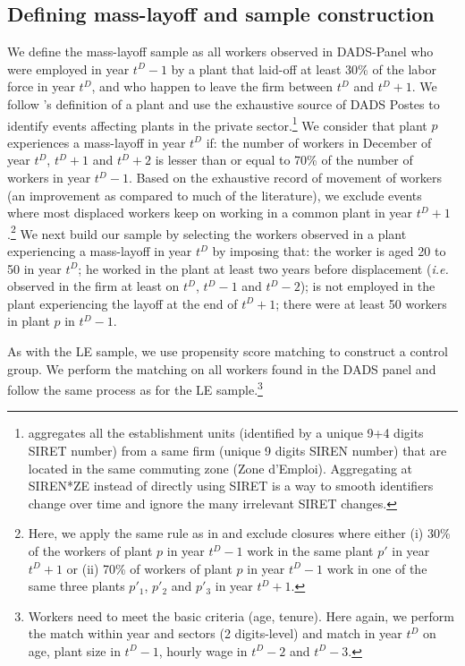 \subsection{Defining mass-layoff and sample construction}\label{appsec:mlo_details}
We define the mass-layoff sample as all workers observed in DADS-Panel who were employed in year $t^D-1$ by a plant that laid-off at least 30\% of the labor force in year $t^D$, and who happen to leave the firm between $t^D$ and $t^D+1$. We follow \citet{Royer2011}'s definition of a plant and use the exhaustive source of DADS Postes to identify events affecting plants in the private sector.\footnote{\citet{Royer2011} aggregates all the establishment units (identified by a unique 9+4 digits SIRET number) from a same firm (unique 9 digits SIREN number) that are located in the same commuting zone (Zone d'Emploi). Aggregating at SIREN*ZE instead of directly using SIRET is a way to smooth identifiers change over time and ignore the many irrelevant SIRET changes.} We consider that plant $p$ experiences a mass-layoff in year $t^D$ if: the number of workers in December of year $t^D$, $t^D+1$ and $t^D+2$ is lesser than or equal to 70\% of the number of workers in year $t^D-1$. Based on the exhaustive record of movement of workers (an improvement as compared to much of the literature), we exclude events where most displaced workers keep on working in a common plant in year $t^D+1$.\footnote{Here, we apply the same rule as in \citet{Gathmann2018} and exclude closures where either (i) 30\% of the workers of plant $p$ in year $t^D-1$ work in the same plant $p'$ in year $t^D+1$ or (ii) 70\% of workers of plant $p$ in year $t^D-1$ work in one of the same three plants $p'_{1}$, $p'_{2}$ and $p'_{3}$ in year $t^D+1$.} We next build our sample by selecting the workers observed in a plant experiencing a mass-layoff in year $t^D$ by imposing that: the worker is aged 20 to 50 in year $t^D$; %
he worked in the plant at least two years before displacement (\textit{i.e.} observed in the firm at least on $t^D$, $t^D-1$ and $t^D-2$);
is not employed in the plant experiencing the layoff at the end of $t^D+1$; there were at least 50 workers in plant $p$ in $t^D-1$.

As with the LE sample, we use propensity score matching to construct a control group. We perform the matching on all workers found in the DADS panel and follow the same process as for the LE sample.\footnote{Workers need to meet the basic criteria (age, tenure). Here again, we perform the match within year and sectors (2 digits-level) and match in year $t^D$ on age, plant size in $t^D-1$, hourly wage in $t^D-2$ and $t^D-3$.}

